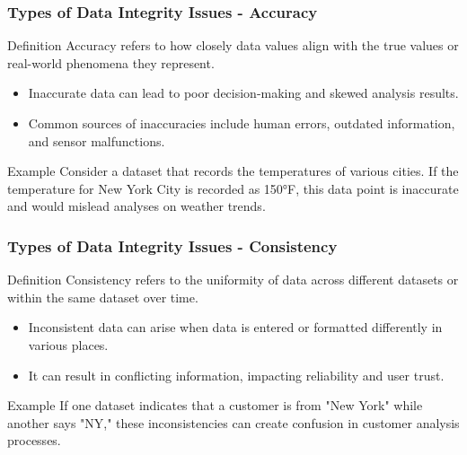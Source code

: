 \documentclass{beamer}
\begin{document}
\begin{frame}[fragile]
    \frametitle{Types of Data Integrity Issues - Accuracy}
    
    \begin{block}{Definition}
        Accuracy refers to how closely data values align with the true values or real-world phenomena they represent.
    \end{block}
    
    \begin{itemize}
        \item Inaccurate data can lead to poor decision-making and skewed analysis results.
        \item Common sources of inaccuracies include human errors, outdated information, and sensor malfunctions.
    \end{itemize}
    
    \begin{block}{Example}
        Consider a dataset that records the temperatures of various cities. If the temperature for New York City is recorded as 150°F, this data point is inaccurate and would mislead analyses on weather trends.
    \end{block}
\end{frame}

\begin{frame}[fragile]
    \frametitle{Types of Data Integrity Issues - Consistency}
    
    \begin{block}{Definition}
        Consistency refers to the uniformity of data across different datasets or within the same dataset over time.
    \end{block}
    
    \begin{itemize}
        \item Inconsistent data can arise when data is entered or formatted differently in various places.
        \item It can result in conflicting information, impacting reliability and user trust.
    \end{itemize}
    
    \begin{block}{Example}
        If one dataset indicates that a customer is from "New York" while another says "NY," these inconsistencies can create confusion in customer analysis processes.
    \end{block}
\end{frame}
\end{document}
